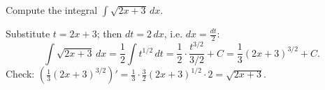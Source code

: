 
\begin{question}
Compute the integral $\displaystyle\int\sqrt{2x+3}\,dx$.
\end{question}

\begin{solution}
Substitute $t=2x+3$; then $dt=2\,dx$, i.e. $dx=\frac{dt}{2}$:
\[ \int\sqrt{2x+3}\,dx=\frac12\int t^{1/2}\,dt=\frac12\cdot\frac{t^{3/2}}{3/2}+C=\frac13(2x+3)^{3/2}+C. \]
Check: $\left(\frac13(2x+3)^{3/2}\right)'=\frac13\cdot\frac32(2x+3)^{1/2}\cdot 2=\sqrt{2x+3}$.
\end{solution}
